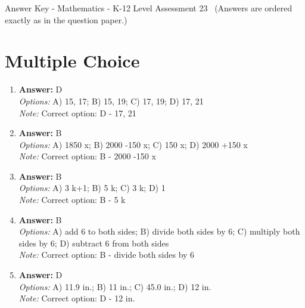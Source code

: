 \documentclass[12pt]{article}
\begin{document}
\begin{center}
Answer Key - Mathematics - K-12 Level Assessment 23 \
\small (Answers are ordered exactly as in the question paper.)
\end{center}

\section*{Multiple Choice}
\begin{enumerate}[label=\arabic*.]
\item \textbf{Answer:} D
\\ \textit{Options:} A) 15, 17; B) 15, 19; C) 17, 19; D) 17, 21
\\ \textit{Note:} Correct option: D - 17, 21
\item \textbf{Answer:} B
\\ \textit{Options:} A) 1850 x; B) 2000 -150 x; C) 150 x; D) 2000 +150 x
\\ \textit{Note:} Correct option: B - 2000 -150 x
\item \textbf{Answer:} B
\\ \textit{Options:} A) 3 k+1; B) 5 k; C) 3 k; D) 1
\\ \textit{Note:} Correct option: B - 5 k
\item \textbf{Answer:} B
\\ \textit{Options:} A) add 6 to both sides; B) divide both sides by 6; C) multiply both sides by 6; D) subtract 6 from both sides
\\ \textit{Note:} Correct option: B - divide both sides by 6
\item \textbf{Answer:} D
\\ \textit{Options:} A) 11.9 in.; B) 11 in.; C) 45.0 in.; D) 12 in.
\\ \textit{Note:} Correct option: D - 12 in.
\end{enumerate}
\end{document}
